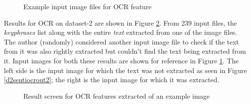 \begin{itemize}
\begin {figure}[h!h]
        \caption{Example input image files for \acs{OCR} feature}
        \label{d2sentiocrin}
    \end {figure}
    \newpage
     Results for \acs{OCR} on dataset-2 are shown in Figure \ref{d2sentiocrout}. From 239 input files, the \textit{keyphrases} list along with the entire \textit{text} extracted from one of the image files. The author (randomly) considered another input image file to check if the text from it was also rightly extracted but couldn't find the text being extracted from it. Input images for both these results are shown for reference in Figure \ref{d2sentiocrin}. The left side is the input image for which the text was not extracted as seen in Figure \ref{d2sentiocrout2}; the right is the input image for which it was extracted.
    \begin {figure}[h!h]
        \centering
        \caption{Result screen for \acs{OCR} features extracted of an example image}
        \label{d2sentiocrout}
    \end {figure}
    \begin {figure}[h!h]
        \centering

\end{figure}
\end{itemize}
